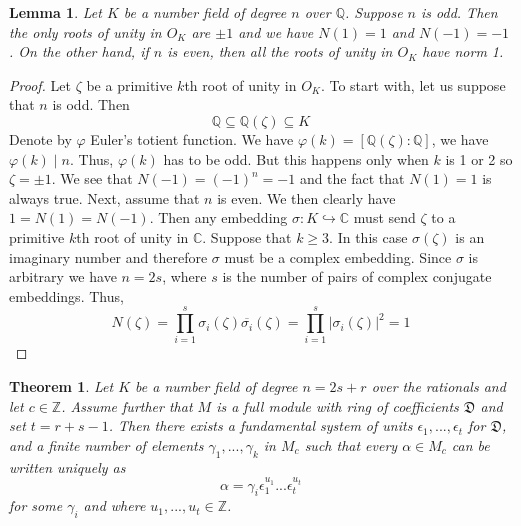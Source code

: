 \documentclass{article}
\newtheorem{theorem}{Theorem}[section]
\newtheorem{lemma}{Lemma}[section]
\newcommand{\mfrak}[1]{\mathfrak{#1}}
\newcommand{\mbb}[1]{\mathbb{#1}}
\begin{document}
\begin{lemma}\label{lem: norm of primitive roots}
    Let $K$ be a number field of degree $n$ over $\mbb Q$. Suppose $n$ is odd. Then the only roots of unity in $O_K$ are $\pm 1$ and we have $N(1) = 1$ and $N(-1) = -1$. On the other hand, if $n$ is even, then all the roots of unity in $O_K$ have norm 1.
\end{lemma}
\begin{proof}
    Let $\zeta$ be a primitive $k$th root of unity in $O_K$. To start with, let us suppose that $n$ is odd. Then 
    $$\mbb Q \subseteq \mbb Q(\zeta) \subseteq K$$
    Denote by $\varphi$ Euler's totient function. We have $\varphi(k) = [\mbb Q(\zeta) : \mbb Q]$, we have $\varphi(k) \mid n$. Thus, $\varphi(k)$ has to be odd. But this happens only when $k$ is 1 or 2 so $\zeta = \pm 1$. We see that $N(-1) = (-1)^n = -1$ and the fact that $N(1) = 1$ is always true. Next, assume that $n$ is even. We then clearly have $1 = N(1) = N(-1)$. Then any embedding $\sigma : K \hookrightarrow \mbb C$ must send $\zeta$ to a primitive $k$th root of unity in $\mbb C$. Suppose that $k \geq 3$. In this case $\sigma(\zeta)$ is an imaginary number and therefore $\sigma$ must be a complex embedding. Since $\sigma$ is arbitrary we have $n = 2s$, where $s$ is the number of pairs of complex conjugate embeddings. Thus,
    $$N(\zeta)  = \prod_{i=1}^s \sigma_i(\zeta) \overline{\sigma_i}(\zeta) = \prod_{i=1}^s |\sigma_i(\zeta)|^2 = 1$$
\end{proof}


\begin{theorem}\label{thm: Shape of solutions to N(x) = c for x in full module}
    Let $K$ be a number field of degree $n = 2s + r$ over the rationals and let $c \in \mbb Z$. Assume further that $M$ is a full module with ring of coefficients $\mfrak D$ and set $t = r+s-1$. Then there exists a fundamental system of units $\epsilon_1, ..., \epsilon_t$ for $\mfrak D$, and a finite number of elements $\gamma_1, ..., \gamma_k$ in $M_c$ such that every $\alpha \in M_c$ can be written uniquely as
    $$\alpha = \gamma_i \epsilon_1^{u_1} ... \epsilon_t^{u_t}$$
    for some $\gamma_i$ and where $u_1, ..., u_t \in \mbb Z$.
\end{theorem}
\end{document}
